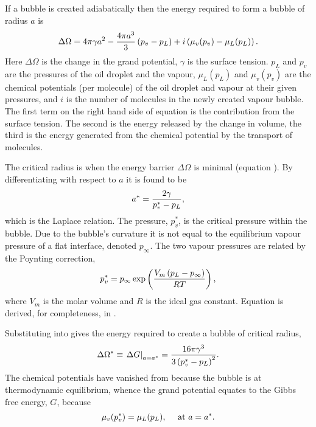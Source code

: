 

If a bubble is created adiabatically then the energy required to form a bubble of radius $a$ is  \cite{Delale2003, Katz1973}
\begin{align}
  \Delta \Omega =4\pi \gamma  a^2 - \frac{4\pi a^3}{3}\left( p_v - p_L \right) + i\left( \mu_v(p_v) - \mu_L(p_L) \right).\label{eqn:DeltaG}
\end{align}
Here $\Delta \Omega$ is the change in the grand potential, $\gamma$ is the surface tension.
$p_L$ and $p_v$ are the pressures of the oil droplet and the vapour,
 $\mu_L(p_L)$ and $\mu_v(p_v)$ are the chemical potentials (per molecule) of the oil droplet and vapour
at their given pressures,
and $i$ is the number of molecules in the newly created vapour bubble.
The first term on the right hand side of equation  is the contribution from the surface tension.
The second is the energy released by the change in volume,
the third is the energy generated from  the chemical potential by the transport of molecules.



The critical radius is  when the energy  barrier $\Delta \Omega$ is minimal (equation ).
By differentiating  with respect to $a$ it is found to be
\begin{align}
  {a^\ast} = \frac{2\gamma}{p_v^\ast-p_L}, \label{eqn:LaplaceRelation}
\end{align}
which is the Laplace relation.  The pressure, $p_v^\ast$, is the critical pressure within the bubble.
Due to the bubble's curvature  it is not equal to the equilibrium vapour pressure of a flat interface, 
denoted $p_\infty$. %
The two vapour pressures are related by the Poynting correction, 
\begin{align}
  p_v^\ast = p_\infty \exp \left(  \frac{V_m\left( p_L -p_\infty \right) }{R T}   \right),\label{eqn:PoyntingCorrection}
\end{align}
where $V_m$ is the molar volume  and $R$ is the ideal gas constant.
Equation  is derived, for completeness, in  .

Substituting  into  gives the energy required to create a bubble of  critical radius,
\begin{align}
   \Delta \Omega^\ast \equiv \left.{\Delta G}\right|_{a = {a^\ast}} = \frac{16\pi\gamma^3}{3\left( p_v^\ast- p_L \right)^2}.\label{eqn:DeltaGStar}
\end{align}
The chemical potentials have vanished from  because  the bubble is at thermodynamic equilibrium, 
whence the grand potential equates to the Gibbs free energy, $G$, because
\begin{align}
  \mu_v(p_v^\ast) = \mu_L(p_L),\label{eqn:thermoEqlbm} \quad\text{ at $a = {a^\ast}$.}
\end{align} 




